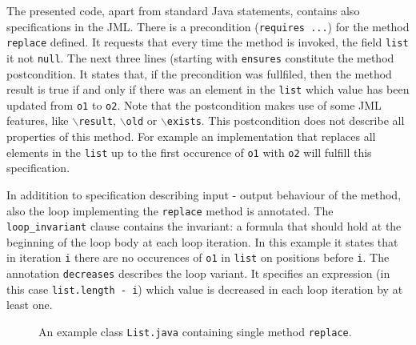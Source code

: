 \documentclass{acm_proc_article-sp}
\begin{document}
The presented code, apart from standard Java statements, contains also specifications in the JML. There is a precondition (\texttt{requires ...}) for the method \texttt{replace} defined. It requests that every time the method is invoked, the field \texttt{list} it not \texttt{null}. The next three lines (starting with \texttt{ensures} constitute the method postcondition. It states that, if the precondition was fullfiled, then the method result is true if and only if there was an element in the \texttt{list} which value has been updated from \texttt{o1} to \texttt{o2}. Note that the postcondition makes use of some JML features, like \texttt{$\backslash$result}, \texttt{$\backslash$old} or \texttt{$\backslash$exists}. This postcondition does not describe all properties of this method. For example an implementation that replaces all elements in the \texttt{list} up to the first occurence of \texttt{o1} with \texttt{o2} will fulfill this specification.

In additition to specification describing input - output behaviour of the method, also the loop implementing the \texttt{replace} method is annotated. The \texttt{loop\_invariant} clause contains the invariant: a formula that should hold at the beginning of the loop body at each loop iteration. In this example it states that in iteration \texttt{i} there are no occurences of \texttt{o1} in \texttt{list} on positions before \texttt{i}. The annotation \texttt{decreases} describes the loop variant. It specifies an expression (in this case \texttt{list.length - i}) which value is decreased in each loop iteration by at least one.


\begin{figure}
\caption{An example class \texttt{List.java} containing single method \texttt{replace}.}
\label{source}
\end{figure}
\end{document}
